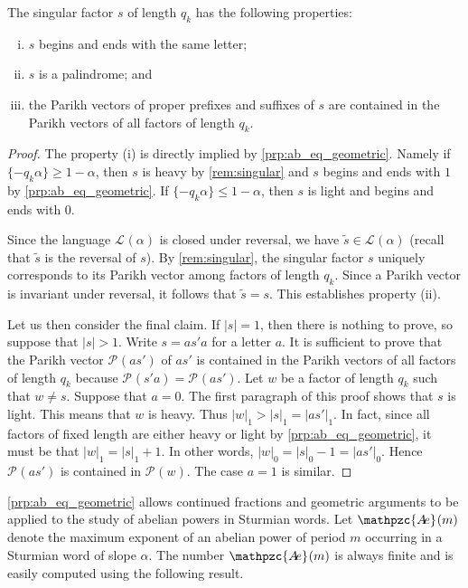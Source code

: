 \documentclass[a4paper,fleqn]{article}
\providecommand{\abs}[1]{\lvert#1\rvert}
\newcommand{\Lang}[2][]{\mathcal{L}_{#1}(#2)}
\newcommand{\mirror}[1]{\widetilde{#1}}
\newcommand{\Parikh}[2][]{\mathcal{P}_{#1}(#2)}
\newcommand{\abexp}[2][]{\mathpzc{A\mkern-3mu e}_{#1}(#2)}
\begin{document}
  \begin{lemma}\label{lem:singular_properties}
    The singular factor $s$ of length $q_k$ has the following properties:
    \begin{enumerate}[(i)]
      \item $s$ begins and ends with the same letter;
      \item $s$ is a palindrome; and
      \item the Parikh vectors of proper prefixes and suffixes of $s$ are contained in the Parikh vectors of all
            factors of length $q_k$.
    \end{enumerate}
  \end{lemma}
  \begin{proof}
    The property (i) is directly implied by \autoref{prp:ab_eq_geometric}. Namely if $\{-q_k\alpha\} \geq 1 - \alpha$,
    then $s$ is heavy by \autoref{rem:singular} and $s$ begins and ends with $1$ by \autoref{prp:ab_eq_geometric}. If
    $\{-q_k\alpha\} \leq 1 - \alpha$, then $s$ is light and begins and ends with $0$.

    Since the language $\Lang{\alpha}$ is closed under reversal, we have $\mirror{s} \in \Lang{\alpha}$ (recall that
    $\mirror{s}$ is the reversal of $s$). By \autoref{rem:singular}, the singular factor $s$ uniquely corresponds to
    its Parikh vector among factors of length $q_k$. Since a Parikh vector is invariant under reversal, it follows that
    $\mirror{s} = s$. This establishes property (ii).

    Let us then consider the final claim. If $\abs{s} = 1$, then there is nothing to prove, so suppose that
    $\abs{s} > 1$. Write $s = as' a$ for a letter $a$. It is sufficient to prove that the Parikh vector $\Parikh{as'}$
    of $as'$ is contained in the Parikh vectors of all factors of length $q_k$ because $\Parikh{s'a} = \Parikh{as'}$.
    Let $w$ be a factor of length $q_k$ such that $w \neq s$. Suppose that $a = 0$. The first paragraph of this proof
    shows that $s$ is light. This means that $w$ is heavy. Thus $\abs{w}_1 > \abs{s}_1 = \abs{as'}_1$. In fact, since
    all factors of fixed length are either heavy or light by \autoref{prp:ab_eq_geometric}, it must be that
    $\abs{w}_1 = \abs{s}_1 + 1$. In other words, $\abs{w}_0 = \abs{s}_0 - 1 = \abs{as'}_0$. Hence $\Parikh{as'}$ is
    contained in $\Parikh{w}$. The case $a = 1$ is similar.
  \end{proof}

  \autoref{prp:ab_eq_geometric} allows continued fractions and geometric arguments to be applied to the study of
  abelian powers in Sturmian words. Let $\abexp{m}$ denote the maximum exponent of an abelian power of period $m$
  occurring in a Sturmian word of slope $\alpha$. The number $\abexp{m}$ is always finite and is easily computed using
  the following result.
\end{document}
